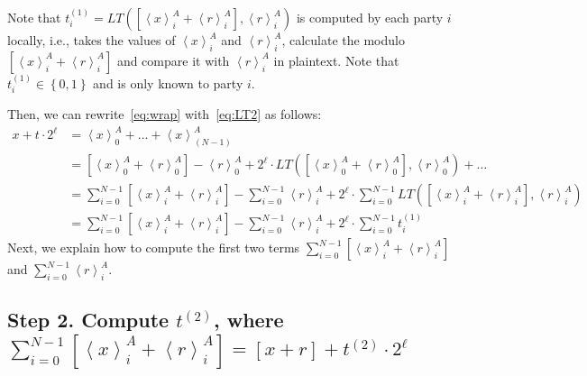 Note that $t^{(1)}_i=LT\left(\left[\left\langle x\right\rangle_i^A + \left\langle r\right\rangle^A_i\right] ,\left\langle r\right\rangle^A_i \right)$ is computed by each party $i$ locally, i.e., takes the values of $\left\langle x\right\rangle_i^A $ and $\left\langle r\right\rangle^A_i$, calculate the modulo $\left[\left\langle x\right\rangle_i^A + \left\langle r\right\rangle^A_i\right] $ and compare it with $\left\langle r\right\rangle^A_i$ in plaintext. Note that $t^{(1)}_i \in \left\{0,1\right\} $ and is only known to party $i$.

Then, we can rewrite~\autoref{eq:wrap} with~\autoref{eq:LT2} as follows:
\begin{equation}
    \begin{split}
        \label{eq:wrap1}
        x + t\cdot 2^{\ell}  & =\left\langle x\right\rangle_0^A+ \ldots +\left\langle x\right\rangle_{\left(N-1\right)}^A \\
        &=\left[ \left\langle x\right\rangle_0^A+ \left\langle r\right\rangle^A_0 \right]   -\left\langle r\right\rangle^A_0+ 2^{\ell}\cdot LT\left(\left[\left\langle x\right\rangle_0^A+ \left\langle r\right\rangle^A_0 \right]  ,\left\langle r\right\rangle^A_0\right)
        + \ldots \\
        &= \sum_{i = 0}^{N-1} \left[\left\langle x\right\rangle_i^A+ \left\langle r\right\rangle^A_i\right] -\sum_{i = 0}^{N-1}\left\langle r\right\rangle^A_i+ 2^{\ell}\cdot \sum_{i = 0}^{N-1}LT\left(\left[\left\langle x\right\rangle_i^A+ \left\langle r\right\rangle^A_i  \right] ,\left\langle r\right\rangle^A_i\right)\\
        &= \sum_{i = 0}^{N-1}  \left[ \left\langle x\right\rangle_i^A+ \left\langle r\right\rangle^A_i\right]   -\sum_{i = 0}^{N-1}\left\langle r\right\rangle^A_i+ 2^{\ell}\cdot \sum_{i = 0}^{N-1}t^{(1)}_i
    \end{split}
\end{equation}
Next, we explain how to compute the first two terms $ \sum_{i = 0}^{N-1} \left[\left\langle x\right\rangle_i^A+ \left\langle r\right\rangle^A_i \right] $ and $\sum_{i = 0}^{N-1}\left\langle r\right\rangle^A_i$.


\subsection{Step 2. Compute $t^{(2)}$, where $ \sum_{i = 0}^{N-1}  \left[ \left\langle x\right\rangle_i^A+ \left\langle r\right\rangle^A_i \right]  =\left[x+r  \right]   + t^{(2)}\cdot 2^{\ell}$}
\label{wrap:step2}


